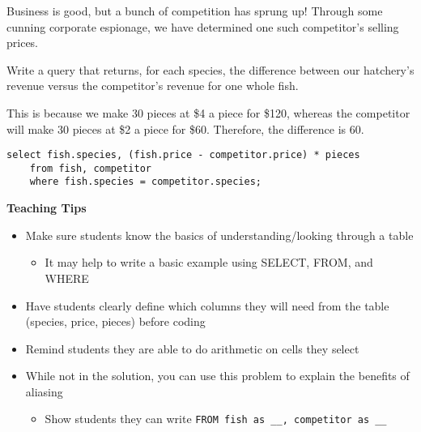 \begin{blocksection}
\question Business is good, but a bunch of competition has sprung up! Through some cunning corporate espionage, we have determined one such competitor's selling prices.

Write a query that returns, for each species, the difference between our hatchery's revenue versus the competitor's revenue for one whole fish.

This is because we make 30 pieces at \$4 a piece for \$120, whereas the competitor will make 30 pieces at \$2 a piece for \$60. Therefore, the difference is 60.

\begin{solution}[1.5in]
\begin{lstlisting}
select fish.species, (fish.price - competitor.price) * pieces
    from fish, competitor
    where fish.species = competitor.species;
\end{lstlisting}
\end{solution}
\end{blocksection}

\begin{blocksection}
\begin{guide}
\textbf{Teaching Tips}
\begin{itemize}
  \item Make sure students know the basics of understanding/looking through a table
  \begin{itemize}
    \item It may help to write a basic example using SELECT, FROM, and WHERE
  \end{itemize}
  \item Have students clearly define which columns they will need from the table (species, price, pieces) before coding
  \item Remind students they are able to do arithmetic on cells they select
  \item While not in the solution, you can use this problem to explain the benefits of aliasing
  \begin{itemize}
    \item Show students they can write \lstinline{FROM fish as __, competitor as __}
  \end{itemize}
\end{itemize}
\end{guide}
\end{blocksection}
